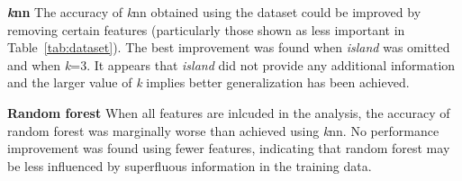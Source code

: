 \documentclass[a4paper, 11pt]{article}
\begin{document}
\textbf{\textit{k}nn}  
The accuracy of \textit{k}nn obtained using the dataset could be improved by removing certain features 
(particularly those shown as less important in Table~\ref{tab:dataset}).
The best improvement was found when \textit{island} was omitted and when \textit{k}=3. It appears that \textit{island} did not provide 
any additional information and the larger value of \textit{k} implies better generalization has been achieved.

\textbf{Random forest}  
When all features are inlcuded in the analysis, the accuracy of random forest was marginally worse 
than achieved using \textit{k}nn. 
No performance improvement was found using fewer features, indicating that random forest
may be less influenced by superfluous information in the training data. 
\end{document}
